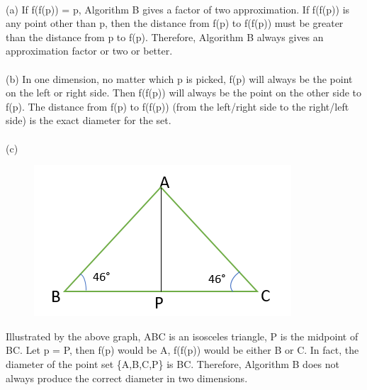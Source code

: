 \begin{problem}{5} ~\\
(a) If f(f(p)) = p, Algorithm B gives a factor of two approximation. If f(f(p)) is any point other than p, then the distance from f(p) to f(f(p)) must be greater than the distance from p to f(p). Therefore, Algorithm B always gives an approximation factor or two or better.\\
\\
(b) In one dimension, no matter which p is picked, f(p) will always be the point on the left or right side. Then f(f(p)) will always be the point on the other side to f(p). The distance from f(p) to f(f(p)) (from the left/right side to the right/left side) is the exact diameter for the set.\\
\\
(c)\begin{figure}[H] 
\centering 
\includegraphics[width=0.6\columnwidth]{1}
\end{figure}
Illustrated by the above graph, ABC is an isosceles triangle, P is the midpoint of BC. Let p = P, then f(p) would be A, f(f(p)) would be either B or C. In fact, the diameter of the point set \{A,B,C,P\} is BC. Therefore, Algorithm B does not always produce the correct diameter in two dimensions.
\end{problem}